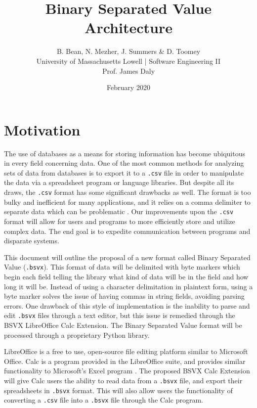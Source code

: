 \documentclass[10pt]{article}
\begin{document}
\title{Binary Separated Value\\Architecture}
\author{B. Bean, N. Mezher, J. Summers \& D. Toomey\\University of Massachusetts Lowell | Software Engineering II\\Prof. James Daly}
\date{February 2020}
\maketitle

\section*{Motivation}

The use of databases as a means for storing information has become ubiquitous in every field concerning data.
One of the most common methods for analyzing sets of data from databases is to export it to a \texttt{.csv} file in order to manipulate the data via a spreadsheet program or language libraries.
But despite all its draws, the \texttt{.csv} format has some significant drawbacks as well.
The format is too bulky and inefficient for many applications, and it relies on a comma delimiter to separate data which can be problematic \cite{Coleman2011}.
Our improvements upon the \texttt{.csv} format will allow for users and programs to more efficiently store and utilize complex data.
The end goal is to expedite communication between programs and disparate systems.

\indent{}
This document will outline the proposal of a new format called Binary Separated Value (\texttt{.bsvx}).
This format of data will be delimited with byte markers which begin each field telling the library what kind of data will be in the field and how long it will be.
Instead of using a character delimitation in plaintext form, using a byte marker solves the issue of having commas in string fields, avoiding parsing errors.
One drawback of this style of implementation is the inability to parse and edit \texttt{.bsvx} files through a text editor, but this issue is remedied through the BSVX LibreOffice Calc Extension.
The Binary Separated Value format will be processed through a proprietary Python library.

\indent{}
LibreOffice is a free to use, open-source file editing platform similar to Microsoft Office.
Calc is a program provided in the LibreOffice suite, and provides similar functionality to Microsoft’s Excel program \cite{Guthrie2012}.
The proposed BSVX Calc Extension will give Calc users the ability to read data from a \texttt{.bsvx} file, and export their spreadsheets in \texttt{.bsvx} format.
This will also allow users the functionality of converting a \texttt{.csv} file into a \texttt{.bsvx} file through the Calc program.
\end{document}
